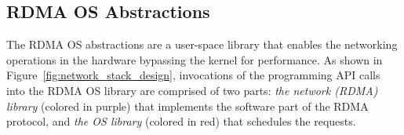 

\subsection{RDMA OS Abstractions} 
The RDMA OS abstractions are a user-space library that enables the networking operations in the \projecttitle{} hardware bypassing the kernel for performance. As shown in Figure~\ref{fig:network_stack_design}, invocations of the \projecttitle{} programming API calls into the RDMA OS library are comprised of two parts: \textit{the network (RDMA) library} (colored in purple) that implements the software part of the RDMA protocol, and \textit{the OS library} (colored in red) that schedules the \projecttitle{} requests.



